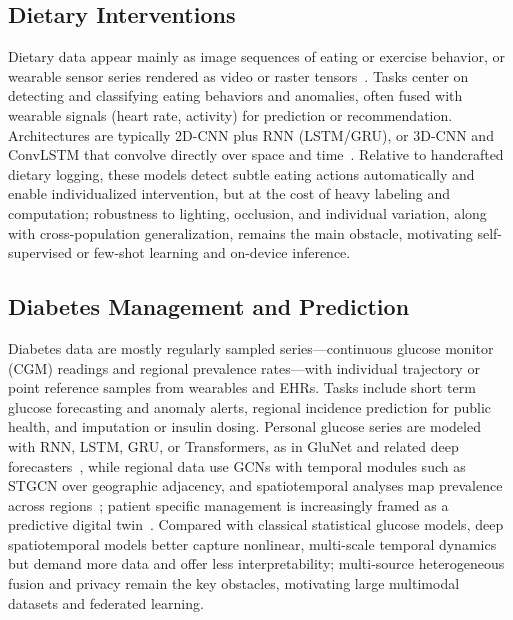 \documentclass[journal]{IEEEtran}
\begin{document}
\subsection{Dietary Interventions}
Dietary data appear mainly as image sequences of eating or exercise behavior, or wearable sensor series rendered as video or raster tensors~\cite{Rouast2020IntakeGesture,Kyritsis2019EatingBehavior}. Tasks center on detecting and classifying eating behaviors and anomalies, often fused with wearable signals (heart rate, activity) for prediction or recommendation. Architectures are typically 2D-CNN plus RNN (LSTM/GRU), or 3D-CNN and ConvLSTM that convolve directly over space and time~\cite{Rouast2020IntakeGesture}. Relative to handcrafted dietary logging, these models detect subtle eating actions automatically and enable individualized intervention, but at the cost of heavy labeling and computation; robustness to lighting, occlusion, and individual variation, along with cross-population generalization, remains the main obstacle, motivating self-supervised or few-shot learning and on-device inference.

\subsection{Diabetes Management and Prediction}
Diabetes data are mostly regularly sampled series---continuous glucose monitor (CGM) readings and regional prevalence rates---with individual trajectory or point reference samples from wearables and EHRs. Tasks include short term glucose forecasting and anomaly alerts, regional incidence prediction for public health, and imputation or insulin dosing. Personal glucose series are modeled with RNN, LSTM, GRU, or Transformers, as in GluNet and related deep forecasters~\cite{Li2020GluNet,Lim2025VirtualCGM}, while regional data use GCNs with temporal modules such as STGCN over geographic adjacency, and spatiotemporal analyses map prevalence across regions~\cite{XiaoLi2016DiabetesSpatiotemporal}; patient specific management is increasingly framed as a predictive digital twin~\cite{Faruqui2024}. Compared with classical statistical glucose models, deep spatiotemporal models better capture nonlinear, multi-scale temporal dynamics but demand more data and offer less interpretability; multi-source heterogeneous fusion and privacy remain the key obstacles, motivating large multimodal datasets and federated learning.
\end{document}
